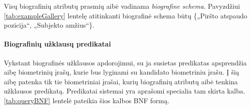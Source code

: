 Visų biografinių atributų prasmių aibė vadinama {\it biografine schema}. Pavyzdžiui \ref{tab:exampleGallery} lentelę atitinkanti biografinė schema būtų \{„Piršto atspaudo pozicija“, „Subjekto amžius“\}.

\paragraph{Biografinių užklausų predikatai}

Vykstant biografinės užklausos apdorojimui, su ja susietas predikatas apsprendžia aibę biometrinių įrašų, kurie bus lyginami su kandidato biometriniu įrašu.
Į šią aibę patenka tik tie biometriniai įrašai, kurių biografinių atributų aibė tenkina užklausos predikatą.
Predikatai sistemai yra aprašomi specialia tam skirta kalba.
\ref{tab:queryBNF} lentelė pateikia šios kalbos BNF formą.

